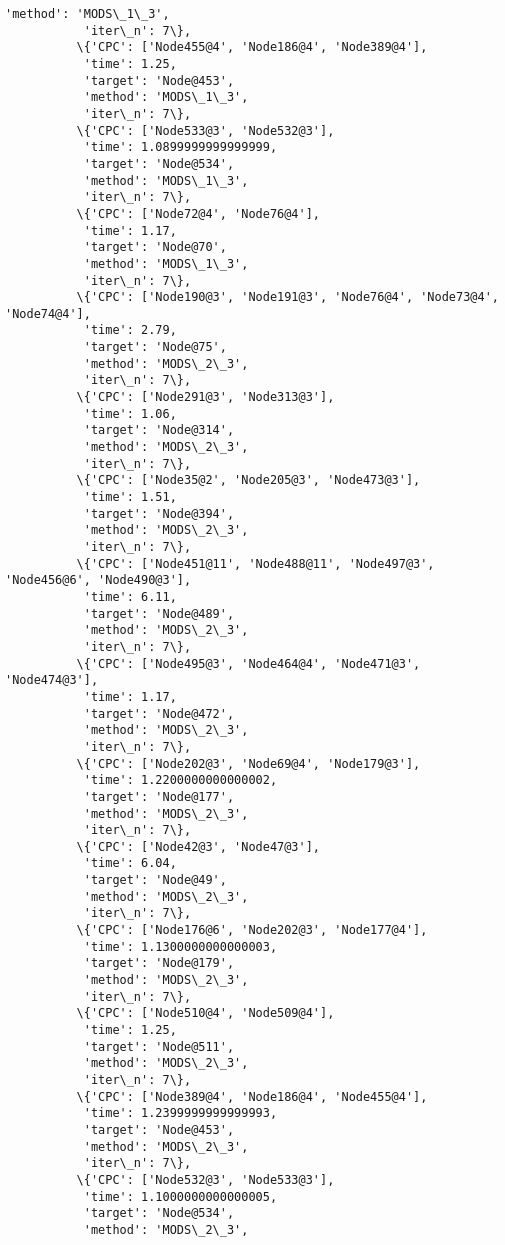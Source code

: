 \documentclass[11pt]{article}
\begin{document}
\begin{Verbatim}[commandchars=\\\{\}]
           'method': 'MODS\_1\_3',
           'iter\_n': 7\},
          \{'CPC': ['Node455@4', 'Node186@4', 'Node389@4'],
           'time': 1.25,
           'target': 'Node@453',
           'method': 'MODS\_1\_3',
           'iter\_n': 7\},
          \{'CPC': ['Node533@3', 'Node532@3'],
           'time': 1.0899999999999999,
           'target': 'Node@534',
           'method': 'MODS\_1\_3',
           'iter\_n': 7\},
          \{'CPC': ['Node72@4', 'Node76@4'],
           'time': 1.17,
           'target': 'Node@70',
           'method': 'MODS\_1\_3',
           'iter\_n': 7\},
          \{'CPC': ['Node190@3', 'Node191@3', 'Node76@4', 'Node73@4', 'Node74@4'],
           'time': 2.79,
           'target': 'Node@75',
           'method': 'MODS\_2\_3',
           'iter\_n': 7\},
          \{'CPC': ['Node291@3', 'Node313@3'],
           'time': 1.06,
           'target': 'Node@314',
           'method': 'MODS\_2\_3',
           'iter\_n': 7\},
          \{'CPC': ['Node35@2', 'Node205@3', 'Node473@3'],
           'time': 1.51,
           'target': 'Node@394',
           'method': 'MODS\_2\_3',
           'iter\_n': 7\},
          \{'CPC': ['Node451@11', 'Node488@11', 'Node497@3', 'Node456@6', 'Node490@3'],
           'time': 6.11,
           'target': 'Node@489',
           'method': 'MODS\_2\_3',
           'iter\_n': 7\},
          \{'CPC': ['Node495@3', 'Node464@4', 'Node471@3', 'Node474@3'],
           'time': 1.17,
           'target': 'Node@472',
           'method': 'MODS\_2\_3',
           'iter\_n': 7\},
          \{'CPC': ['Node202@3', 'Node69@4', 'Node179@3'],
           'time': 1.2200000000000002,
           'target': 'Node@177',
           'method': 'MODS\_2\_3',
           'iter\_n': 7\},
          \{'CPC': ['Node42@3', 'Node47@3'],
           'time': 6.04,
           'target': 'Node@49',
           'method': 'MODS\_2\_3',
           'iter\_n': 7\},
          \{'CPC': ['Node176@6', 'Node202@3', 'Node177@4'],
           'time': 1.1300000000000003,
           'target': 'Node@179',
           'method': 'MODS\_2\_3',
           'iter\_n': 7\},
          \{'CPC': ['Node510@4', 'Node509@4'],
           'time': 1.25,
           'target': 'Node@511',
           'method': 'MODS\_2\_3',
           'iter\_n': 7\},
          \{'CPC': ['Node389@4', 'Node186@4', 'Node455@4'],
           'time': 1.2399999999999993,
           'target': 'Node@453',
           'method': 'MODS\_2\_3',
           'iter\_n': 7\},
          \{'CPC': ['Node532@3', 'Node533@3'],
           'time': 1.1000000000000005,
           'target': 'Node@534',
           'method': 'MODS\_2\_3',

\end{Verbatim}
\end{document}
